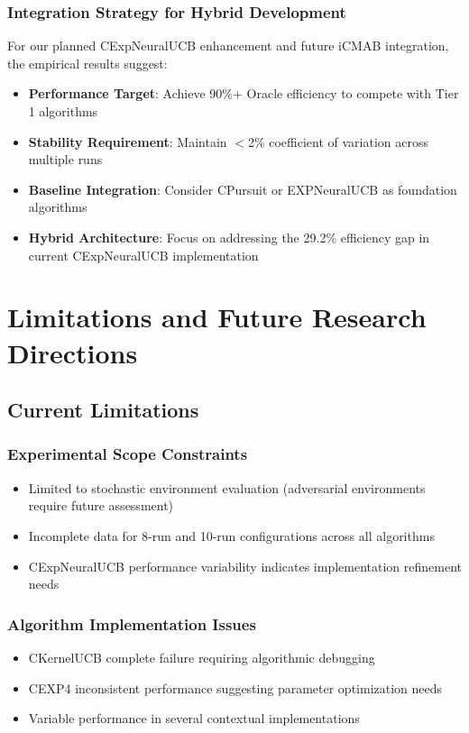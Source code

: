 \documentclass[12pt,a4paper]{article}
\begin{document}
\subsubsection{Integration Strategy for Hybrid Development}

For our planned CExpNeuralUCB enhancement and future iCMAB integration, the empirical results suggest:

\begin{itemize}
\item \textbf{Performance Target}: Achieve 90\%+ Oracle efficiency to compete with Tier 1 algorithms
\item \textbf{Stability Requirement}: Maintain $<$2\% coefficient of variation across multiple runs
\item \textbf{Baseline Integration}: Consider CPursuit or EXPNeuralUCB as foundation algorithms
\item \textbf{Hybrid Architecture}: Focus on addressing the 29.2\% efficiency gap in current CExpNeuralUCB implementation
\end{itemize}

\section{Limitations and Future Research Directions}

\subsection{Current Limitations}

\subsubsection{Experimental Scope Constraints}
\begin{itemize}
\item Limited to stochastic environment evaluation (adversarial environments require future assessment)
\item Incomplete data for 8-run and 10-run configurations across all algorithms
\item CExpNeuralUCB performance variability indicates implementation refinement needs
\end{itemize}

\subsubsection{Algorithm Implementation Issues}
\begin{itemize}
\item CKernelUCB complete failure requiring algorithmic debugging
\item CEXP4 inconsistent performance suggesting parameter optimization needs
\item Variable performance in several contextual implementations
\end{itemize}
\end{document}
